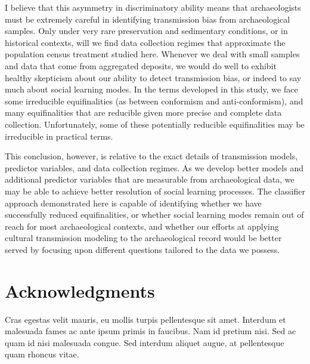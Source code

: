 \documentclass[10pt,letterpaper]{article}
\begin{document}
I believe that this asymmetry in discriminatory ability means that archaeologists must be extremely careful in identifying transmission bias from archaeological samples.  Only under very rare preservation and sedimentary conditions, or in historical contexts, will we find data collection regimes that approximate the population census treatment studied here.  Whenever we deal with small samples and data that come from aggregated deposits, we would do well to exhibit healthy skepticism about our ability to detect transmission bias, or indeed to say much about social learning modes.  In the terms developed in this study, we face some irreducible equifinalities (as between conformism and anti-conformism), and many equifinalities that are reducible given more precise and complete data collection.  Unfortunately, some of these potentially reducible equifinalities may be irreducible in practical terms.  

This conclusion, however, is relative to the exact details of transmission models, predictor variables, and data collection regimes.  As we develop better models and additional predictor variables that are measurable from archaeological data, we may be able to achieve better resolution of social learning processes.  The classifier approach demonstrated here is capable of identifying whether we have successfully reduced equifinalities, or whether social learning modes remain out of reach for most archaeological contexts, and whether our efforts at applying cultural transmission modeling to the archaeological record would be better served by focusing upon different questions tailored to the data we possess.  


\section*{Acknowledgments}
Cras egestas velit mauris, eu mollis turpis pellentesque sit amet. Interdum et malesuada fames ac ante ipsum primis in faucibus. Nam id pretium nisi. Sed ac quam id nisi malesuada congue. Sed interdum aliquet augue, at pellentesque quam rhoncus vitae.

\nolinenumbers

%
%
% 

\end{document}
